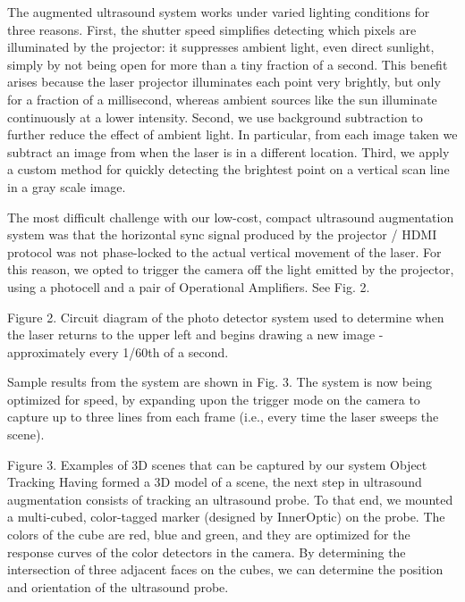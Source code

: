 \documentclass{llncs}
\begin{document}
The augmented ultrasound system works under varied lighting conditions for three reasons.  First, the shutter speed simplifies detecting which pixels are illuminated by the projector: it suppresses ambient light, even direct sunlight, simply by not being open for more than a tiny fraction of a second. This benefit arises because the laser projector illuminates each point very brightly, but only for a fraction of a millisecond, whereas ambient sources like the sun illuminate continuously at a lower intensity. Second, we use background subtraction to further reduce the effect of ambient light.  In particular, from each image taken we subtract an image from when the laser is in a different location.  Third, we apply a custom method for quickly detecting the brightest point on a vertical scan line in a gray scale image.
 
The most difficult challenge with our low-cost, compact ultrasound augmentation system was that the horizontal sync signal produced by the projector / HDMI protocol was not phase-locked to the actual vertical movement of the laser.  For this reason, we opted to trigger the camera off the light emitted by the projector, using a photocell and a pair of Operational Amplifiers.  See Fig. 2.


Figure 2. Circuit diagram of the photo detector system used to determine when the laser returns to the upper left and begins drawing a new image - approximately every 1/60th of a second.

Sample results from the system are shown in Fig. 3.  The system is now being optimized for speed, by expanding upon the trigger mode on the camera to capture up to three lines from each frame (i.e., every time the laser sweeps the scene).




Figure 3. Examples of 3D scenes that can be captured by our system
Object Tracking
Having formed a 3D model of a scene, the next step in ultrasound augmentation consists of tracking an ultrasound probe. To that end, we mounted a multi-cubed, color-tagged marker (designed by InnerOptic) on the probe.  The colors of the cube are red, blue and green, and they are optimized for the response curves of the color detectors in the camera. By determining the intersection of three adjacent faces on the cubes, we can determine the position and orientation of the ultrasound probe.
 
\end{document}
